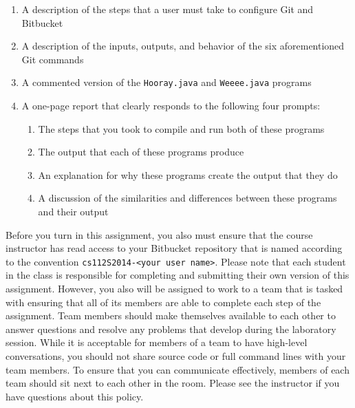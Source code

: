   \vspace*{-.05in}
  \begin{enumerate}
	
    \item A description of the steps that a user must take to configure Git and Bitbucket

    \item A description of the inputs, outputs, and behavior of the six aforementioned Git commands

    \item A commented version of the {\tt Hooray.java} and {\tt Weeee.java} programs
	
    \item A one-page report that clearly responds to the following four prompts:
  
      \vspace*{-.05in}
      \begin{enumerate}

	\item The steps that you took to compile and run both of these programs

	\item The output that each of these programs produce

	\item An explanation for why these programs create the output that they do

	\item A discussion of the similarities and differences between these programs and their output

      \end{enumerate}

  \end{enumerate}

Before you turn in this assignment, you also must ensure that the course instructor has read access to your Bitbucket
repository that is named according to the convention {\tt cs112S2014-<your user name>}. Please note that each student in
the class is responsible for completing and submitting their own version of this assignment.  However, you also will be
assigned to work to a team that is tasked with ensuring that all of its members are able to complete each step of the
assignment.  Team members should make themselves available to each other to answer questions and resolve any problems
that develop during the laboratory session. While it is acceptable for members of a team to have high-level
conversations, you should not share source code or full command lines with your team members. To ensure that you can
communicate effectively, members of each team should sit next to each other in the room.  Please see the instructor if
you have questions about this policy.




